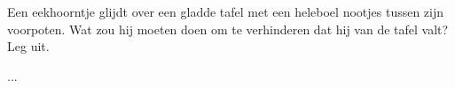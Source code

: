 

\item{}Een eekhoorntje glijdt over een gladde tafel met een heleboel nootjes tussen zijn voorpoten. Wat zou hij moeten doen om te verhinderen dat hij van de tafel valt? Leg uit.

\begin{oplossing}
...
\end{oplossing}